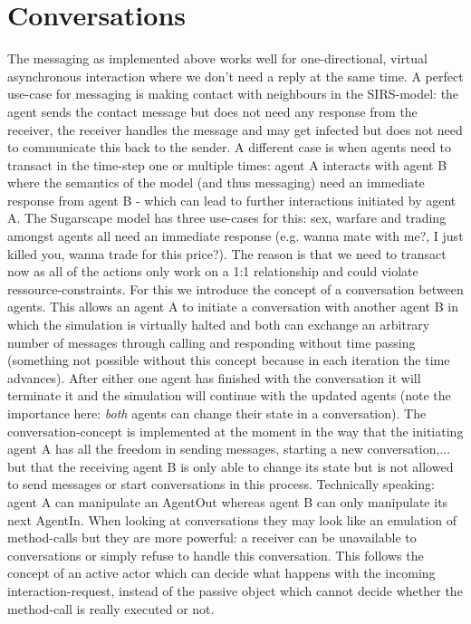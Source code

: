
\section{Conversations}
The messaging as implemented above works well for one-directional, virtual asynchronous interaction where we don't need a reply at the same time. A perfect use-case for messaging is making contact with neighbours in the SIRS-model: the agent sends the contact message but does not need any response from the receiver, the receiver handles the message and may get infected but does not need to communicate this back to the sender. 
A different case is when agents need to transact in the time-step one or multiple times: agent A interacts with agent B where the semantics of the model (and thus messaging) need an immediate response from agent B - which can lead to further interactions initiated by agent A. The Sugarscape model has three use-cases for this: sex, warfare and trading amongst agents all need an immediate response (e.g. wanna mate with me?, I just killed you, wanna trade for this price?). The reason is that we need to transact now as all of the actions only work on a 1:1 relationship and could violate ressource-constraints.
For this we introduce the concept of a conversation between agents. This allows an agent A to initiate a conversation with another agent B in which the simulation is virtually halted and both can exchange an arbitrary number of messages through calling and responding without time passing (something not possible without this concept because in each iteration the time advances). After either one agent has finished with the conversation it will terminate it and the simulation will continue with the updated agents (note the importance here: \textit{both} agents can change their state in a conversation). The conversation-concept is implemented at the moment in the way that the initiating agent A has all the freedom in sending messages, starting a new conversation,... but that the receiving agent B is only able to change its state but is not allowed to send messages or start conversations in this process. Technically speaking: agent A can manipulate an AgentOut whereas agent B can only manipulate its next AgentIn.
When looking at conversations they may look like an emulation of method-calls but they are more powerful: a receiver can be unavailable to conversations or simply refuse to handle this conversation. This follows the concept of an active actor which can decide what happens with the incoming interaction-request, instead of the passive object which cannot decide whether the method-call is really executed or not.

